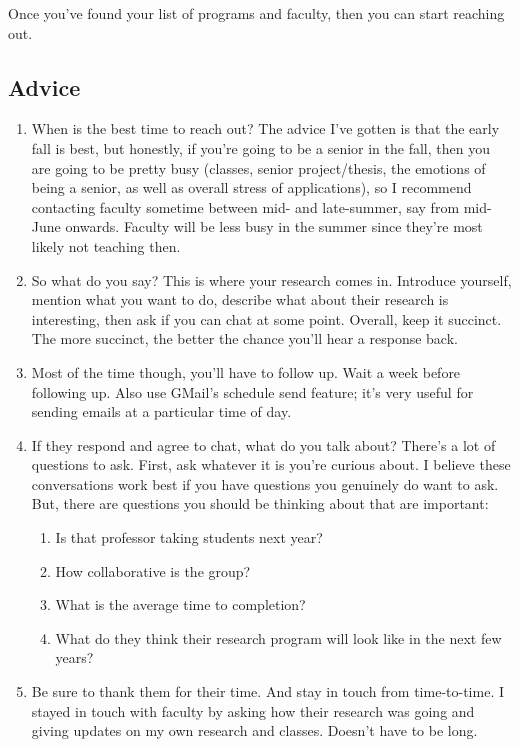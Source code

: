 \documentclass[12pt]{article}
\begin{document}
Once you've found your list of programs and faculty, then you can start reaching out.

\subsection{Advice}
\begin{enumerate}
\item When is the best time to reach out? The advice I've gotten is that the early fall is best, but honestly, if you're going to be a senior in the fall, then you are going to be pretty busy (classes, senior project/thesis, the emotions of being a senior, as well as overall stress of applications), so I recommend contacting faculty sometime between mid- and late-summer, say from mid-June onwards. Faculty will be less busy in the summer since they're most likely not teaching then.

\item So what do you say? This is where your research comes in. Introduce yourself, mention what you want to do, describe what about their research is interesting, then ask if you can chat at some point. Overall, keep it succinct. The more succinct, the better the chance you'll hear a response back.

\item Most of the time though, you'll have to follow up. Wait a week before following up. Also use GMail's schedule send feature; it's very useful for sending emails at a particular time of day.

\item If they respond and agree to chat, what do you talk about? There's a lot of questions to ask. First, ask whatever it is you're curious about. I believe these conversations work best if you have questions you genuinely do want to ask. But, there are questions you should be thinking about that are important:
\begin{enumerate}
\item Is that professor taking students next year?
\item How collaborative is the group?
\item What is the average time to completion?
\item What do they think their research program will look like in the next few years?
\end{enumerate}

\item Be sure to thank them for their time. And stay in touch from time-to-time. I stayed in touch with faculty by asking how their research was going and giving updates on my own research and classes. Doesn't have to be long.
\end{enumerate}
\end{document}
